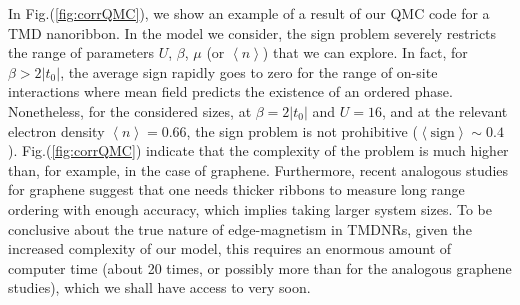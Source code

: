 In Fig.(\ref{fig:corrQMC}), we show an example of a result of our QMC code for a TMD nanoribbon.
In the model we consider, the sign problem severely restricts the range of parameters $U$, $\beta$, $\mu$ (or $\left\langle n \right\rangle$) that we can explore.
In fact, for $\beta > 2 | t_0 |$, the average sign rapidly goes to zero for the range of on-site interactions where mean field predicts the existence of an ordered phase.
Nonetheless, for the considered sizes, at $\beta = 2 | t_0 |$ and $U = 16$, and at the relevant electron density $\left\langle n \right\rangle = 0.66$, the sign problem is not prohibitive ($\left\langle \text{sign} \right\rangle \sim0.4$).
Fig.(\ref{fig:corrQMC}) indicate that the complexity of the problem is much higher than, for example, in the case of graphene.
Furthermore, recent analogous studies for graphene \cite{feldner_dynamical_2011, yang_strain-tuning_2017,raczkowski_interplay_2017} suggest that one needs thicker ribbons to measure long range ordering with enough accuracy, which implies taking larger system sizes.
To be conclusive about the true nature of edge-magnetism in TMDNRs, given the increased complexity of our model, this requires an enormous amount of computer time (about 20 times, or possibly more than for the analogous graphene studies), which we shall have access to very soon.



